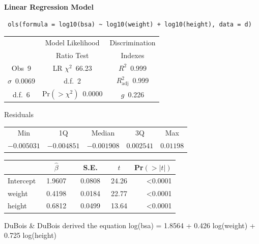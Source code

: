 \centerline{\textbf{Linear Regression Model}}
 
 \begin{verbatim}
 ols(formula = log10(bsa) ~ log10(weight) + log10(height), data = d)
 \end{verbatim}
 
 {\selectfont \begin{center}\begin{tabular}{|c|c|c|}\hline
&Model Likelihood&Discrimination\\
&Ratio Test&Indexes\\\hline
Obs~\hfill 9&LR $\chi^{2}$~\hfill 66.23&$R^{2}$~\hfill 0.999\\
$\sigma$~\hfill 0.0069&d.f.~\hfill 2&$R^{2}_{\textrm{adj}}$~\hfill 0.999\\
d.f.~\hfill 6&Pr$(>\chi^{2})$~\hfill 0.0000&$g$~\hfill 0.226\\
\hline
\end{tabular}
\end{center}}
 \begin{center}
 Residuals
 

 \begin{tabular}{ccccc}
Min&1Q&Median&3Q&Max\\
$-0.005031$&$-0.004851$&$-0.001908$&$0.002541$&$0.01198$\\
\end{tabular}
 \end{center}
 
 \setlongtables\begin{longtable}{lrrrr}\hline
 \multicolumn{1}{l}{}&\multicolumn{1}{c}{$\hat{\beta}$}&\multicolumn{1}{c}{S.E.}&\multicolumn{1}{c}{$t$}&\multicolumn{1}{c}{Pr$(>|t|)$}\tabularnewline
 \hline
 \endhead
 \hline
 \endfoot
 Intercept&~1.9607~&~0.0808~&24.26&\textless 0.0001\tabularnewline
 weight&~0.4198~&~0.0184~&22.77&\textless 0.0001\tabularnewline
 height&~0.6812~&~0.0499~&13.64&\textless 0.0001\tabularnewline
 \hline
 \end{longtable}
 \addtocounter{table}{-1}

DuBois \& DuBois derived the equation log(bsa) = 1.8564 + 0.426
log(weight) + 0.725 log(height)

